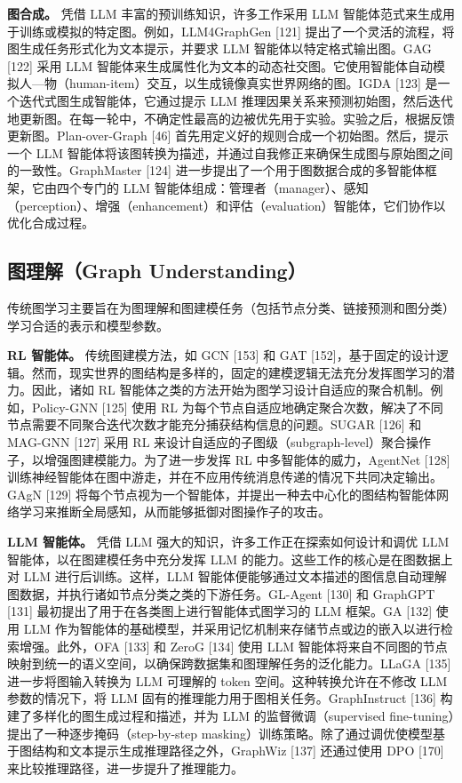\documentclass[10pt,UTF8,fontset=fandol]{ctexart}
\begin{document}
\textbf{图合成。} 凭借 LLM 丰富的预训练知识，许多工作采用 LLM 智能体范式来生成用于训练或模拟的特定图。例如，LLM4GraphGen [121] 提出了一个灵活的流程，将图生成任务形式化为文本提示，并要求 LLM 智能体以特定格式输出图。GAG [122] 采用 LLM 智能体来生成属性化为文本的动态社交图。它使用智能体自动模拟人—物（human-item）交互，以生成镜像真实世界网络的图。IGDA [123] 是一个迭代式图生成智能体，它通过提示 LLM 推理因果关系来预测初始图，然后迭代地更新图。在每一轮中，不确定性最高的边被优先用于实验。实验之后，根据反馈更新图。Plan-over-Graph [46] 首先用定义好的规则合成一个初始图。然后，提示一个 LLM 智能体将该图转换为描述，并通过自我修正来确保生成图与原始图之间的一致性。GraphMaster [124] 进一步提出了一个用于图数据合成的多智能体框架，它由四个专门的 LLM 智能体组成：管理者（manager）、感知（perception）、增强（enhancement）和评估（evaluation）智能体，它们协作以优化合成过程。

\subsection{图理解（Graph Understanding）}

传统图学习主要旨在为图理解和图建模任务（包括节点分类、链接预测和图分类）学习合适的表示和模型参数。

\textbf{RL 智能体。} 传统图建模方法，如 GCN [153] 和 GAT [152]，基于固定的设计逻辑。然而，现实世界的图结构是多样的，固定的建模逻辑无法充分发挥图学习的潜力。因此，诸如 RL 智能体之类的方法开始为图学习设计自适应的聚合机制。例如，Policy-GNN [125] 使用 RL 为每个节点自适应地确定聚合次数，解决了不同节点需要不同聚合迭代次数才能充分捕获结构信息的问题。SUGAR [126] 和 MAG-GNN [127] 采用 RL 来设计自适应的子图级（subgraph-level）聚合操作子，以增强图建模能力。为了进一步发挥 RL 中多智能体的威力，AgentNet [128] 训练神经智能体在图中游走，并在不应用传统消息传递的情况下共同决定输出。GAgN [129] 将每个节点视为一个智能体，并提出一种去中心化的图结构智能体网络学习来推断全局感知，从而能够抵御对图操作子的攻击。

\textbf{LLM 智能体。} 凭借 LLM 强大的知识，许多工作正在探索如何设计和调优 LLM 智能体，以在图建模任务中充分发挥 LLM 的能力。这些工作的核心是在图数据上对 LLM 进行后训练。这样，LLM 智能体便能够通过文本描述的图信息自动理解图数据，并执行诸如节点分类之类的下游任务。GL-Agent [130] 和 GraphGPT [131] 最初提出了用于在各类图上进行智能体式图学习的 LLM 框架。GA [132] 使用 LLM 作为智能体的基础模型，并采用记忆机制来存储节点或边的嵌入以进行检索增强。此外，OFA [133] 和 ZeroG [134] 使用 LLM 智能体将来自不同图的节点映射到统一的语义空间，以确保跨数据集和图理解任务的泛化能力。LLaGA [135] 进一步将图输入转换为 LLM 可理解的 token 空间。这种转换允许在不修改 LLM 参数的情况下，将 LLM 固有的推理能力用于图相关任务。GraphInstruct [136] 构建了多样化的图生成过程和描述，并为 LLM 的监督微调（supervised fine-tuning）提出了一种逐步掩码（step-by-step masking）训练策略。除了通过调优使模型基于图结构和文本提示生成推理路径之外，GraphWiz [137] 还通过使用 DPO [170] 来比较推理路径，进一步提升了推理能力。
\end{document}
